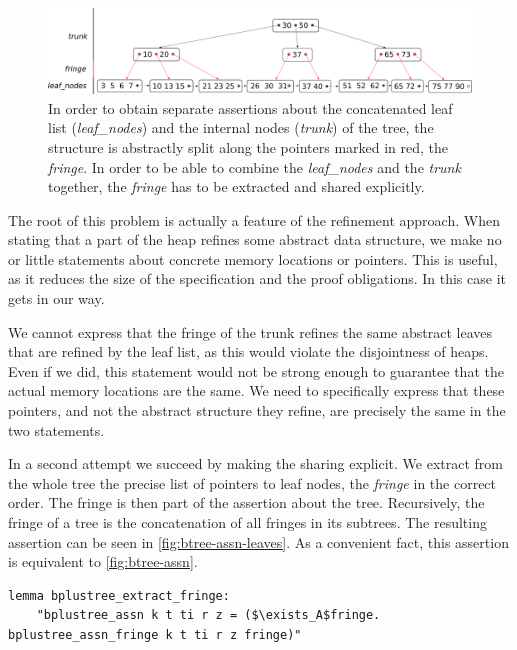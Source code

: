 \documentclass[a4paper,UKenglish,cleveref, cref, thm-restate]{lipics-v2021}
\newcommand{\btree}{B$^+$-tree}
\begin{document}
\begin{figure}
    \centering
    \includegraphics[width=1\linewidth]{btree-view-split.pdf}
    \caption[Split view of the \btree]
    {In order to obtain separate assertions about the concatenated leaf list (\emph{leaf\_nodes})
    and the internal nodes (\emph{trunk}) of the tree, the structure is abstractly split along the
    pointers marked in red, the \emph{fringe}. In order to be able to combine the \emph{leaf\_nodes} and the \emph{trunk} together,
    the \emph{fringe} has to be extracted and shared explicitly.}
    \label{fig:btree-view-split}
\end{figure}

The root of this problem is actually a feature of the refinement approach.
When stating that a part of the heap
refines some abstract data structure,
we make no or little statements about concrete memory locations or pointers.
This is useful, as it reduces the size of the specification
and the proof obligations.
In this case it gets in our way.


We cannot express that the fringe of the trunk refines the same abstract leaves
that are refined by the leaf list,
as this would violate the disjointness of heaps.
Even if we did, this statement would not be strong enough
to guarantee that the actual memory locations
are the same.
We need to specifically express that these pointers,
and not the abstract structure they refine,
are precisely the same in the two statements.

In a second attempt we succeed by making the sharing explicit.
We extract from the whole tree the precise list of pointers to leaf nodes, the \emph{fringe}
in the correct order.
The fringe is then part of the assertion about the tree.
Recursively, the fringe of a tree is the concatenation of all fringes
in its subtrees.
The resulting assertion can be seen in \cref{fig:btree-assn-leaves}.
As a convenient fact, this assertion is equivalent to \cref{fig:btree-assn}.

\begin{lstlisting}[mathescape=true, language=Isabelle,label=lst:btree-extract-fringe]
lemma bplustree_extract_fringe:
    "bplustree_assn k t ti r z = ($\exists_A$fringe. bplustree_assn_fringe k t ti r z fringe)"
\end{lstlisting}
\end{document}

